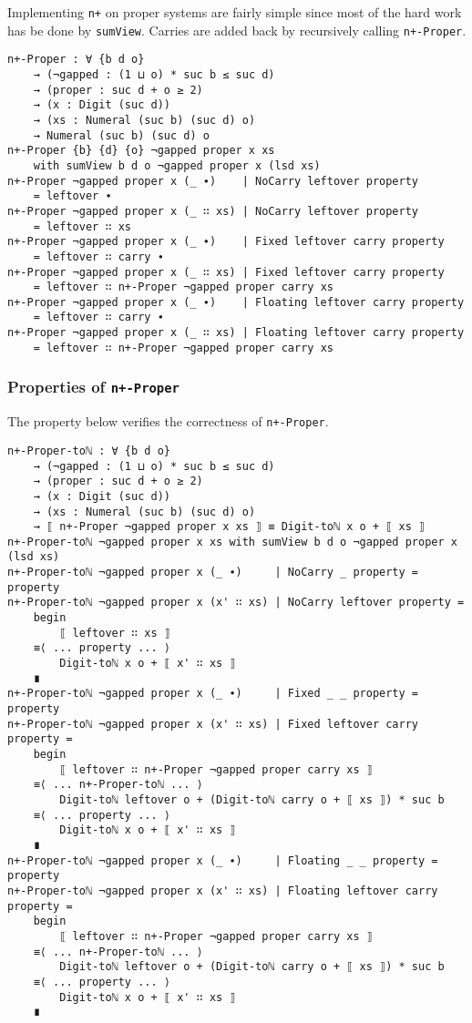 \documentclass[\main/thesis.tex]{subfiles}
\begin{document}
Implementing \lstinline|n+| on proper systems are fairly simple since most
of the hard work has be done by \lstinline|sumView|.
Carries are added back by recursively calling \lstinline|n+-Proper|.

\begin{lstlisting}[basicstyle=\ttfamily\scriptsize]
n+-Proper : ∀ {b d o}
    → (¬gapped : (1 ⊔ o) * suc b ≤ suc d)
    → (proper : suc d + o ≥ 2)
    → (x : Digit (suc d))
    → (xs : Numeral (suc b) (suc d) o)
    → Numeral (suc b) (suc d) o
n+-Proper {b} {d} {o} ¬gapped proper x xs
    with sumView b d o ¬gapped proper x (lsd xs)
n+-Proper ¬gapped proper x (_ ∙)    | NoCarry leftover property
    = leftover ∙
n+-Proper ¬gapped proper x (_ ∷ xs) | NoCarry leftover property
    = leftover ∷ xs
n+-Proper ¬gapped proper x (_ ∙)    | Fixed leftover carry property
    = leftover ∷ carry ∙
n+-Proper ¬gapped proper x (_ ∷ xs) | Fixed leftover carry property
    = leftover ∷ n+-Proper ¬gapped proper carry xs
n+-Proper ¬gapped proper x (_ ∙)    | Floating leftover carry property
    = leftover ∷ carry ∙
n+-Proper ¬gapped proper x (_ ∷ xs) | Floating leftover carry property
    = leftover ∷ n+-Proper ¬gapped proper carry xs
\end{lstlisting}

\subsubsection{Properties of \lstinline|n+-Proper|}

The property below verifies the correctness of \lstinline|n+-Proper|.

\begin{lstlisting}[basicstyle=\ttfamily\scriptsize]
n+-Proper-toℕ : ∀ {b d o}
    → (¬gapped : (1 ⊔ o) * suc b ≤ suc d)
    → (proper : suc d + o ≥ 2)
    → (x : Digit (suc d))
    → (xs : Numeral (suc b) (suc d) o)
    → ⟦ n+-Proper ¬gapped proper x xs ⟧ ≡ Digit-toℕ x o + ⟦ xs ⟧
n+-Proper-toℕ ¬gapped proper x xs with sumView b d o ¬gapped proper x (lsd xs)
n+-Proper-toℕ ¬gapped proper x (_ ∙)     | NoCarry _ property = property
n+-Proper-toℕ ¬gapped proper x (x' ∷ xs) | NoCarry leftover property =
    begin
        ⟦ leftover ∷ xs ⟧
    ≡⟨ ... property ... ⟩
        Digit-toℕ x o + ⟦ x' ∷ xs ⟧
    ∎
n+-Proper-toℕ ¬gapped proper x (_ ∙)     | Fixed _ _ property = property
n+-Proper-toℕ ¬gapped proper x (x' ∷ xs) | Fixed leftover carry property =
    begin
        ⟦ leftover ∷ n+-Proper ¬gapped proper carry xs ⟧
    ≡⟨ ... n+-Proper-toℕ ... ⟩
        Digit-toℕ leftover o + (Digit-toℕ carry o + ⟦ xs ⟧) * suc b
    ≡⟨ ... property ... ⟩
        Digit-toℕ x o + ⟦ x' ∷ xs ⟧
    ∎
n+-Proper-toℕ ¬gapped proper x (_ ∙)     | Floating _ _ property = property
n+-Proper-toℕ ¬gapped proper x (x' ∷ xs) | Floating leftover carry property =
    begin
        ⟦ leftover ∷ n+-Proper ¬gapped proper carry xs ⟧
    ≡⟨ ... n+-Proper-toℕ ... ⟩
        Digit-toℕ leftover o + (Digit-toℕ carry o + ⟦ xs ⟧) * suc b
    ≡⟨ ... property ... ⟩
        Digit-toℕ x o + ⟦ x' ∷ xs ⟧
    ∎
\end{lstlisting}
\end{document}
